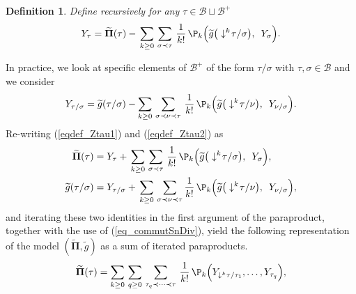 \documentclass[11pt]{preprint}
\newcommand{\mcB}{\mathcal{B}}
\newcounter{theorem}
\newtheorem{defi}[theorem]{Definition}
\def\PPi{\boldsymbol{\Pi}}
\def\eqref#1{(\ref{#1})}
\begin{document}
	\begin{defi}\label{def_Ytau}
		Define recursively for any $\tau\in \mcB \sqcup \mcB^+$ 
		\begin{equation}\label{eqdef_Ztau1}
			Y_{\tau} = \widetilde{ \PPi}(\tau) - \, \sum_{k\geq 0} \, \sum_{\sigma\prec \tau} \, \frac{1}{k!} \, \P_k\Big( \widetilde{ g}\big(\downarrow^k\hspace{-2pt} \tau/\sigma\big) , \enskip Y_\sigma  \Big).
		\end{equation}
	\end{defi}
	In practice, we look at specific elements of $\mcB^+$ of the form $ \tau / \sigma $ with $ \tau, \sigma \in \mcB $ and we consider 
	\begin{equation} \label{eqdef_Ztau2}
		Y_{\tau/\sigma} = \widetilde{ g}(\tau/\sigma) - \sum_{k\geq 0} \, \sum_{\sigma\prec \nu\prec \tau} \, \frac{1}{k!} \, \P_k\Big( \widetilde{ g}\big( \downarrow^k\hspace{-2pt}\tau/\nu\big) , \enskip Y_{\nu/\sigma}  \Big).
	\end{equation}
	Re-writing \eqref{eqdef_Ztau1} and \eqref{eqdef_Ztau2} as 
	\begin{equation}\label{eq_parac_representation}\begin{split}
			\widetilde{ \PPi}(\tau) &=Y_{\tau}  + \, \sum_{k\geq 0}\, \sum_{\sigma\prec \tau} \, \frac{1}{k!} \, \P_k\Big( \widetilde{ g}\big(\downarrow^k\hspace{-2pt} \tau/\sigma\big) , \enskip Y_\sigma  \Big),
			\\
			\widetilde{ g}(\tau/\sigma) &=Y_{\tau/\sigma}  + \,  \sum_{k\geq 0} \, \sum_{\sigma\prec \nu \prec \tau} \frac{1}{k!} \, \P_k\Big( \widetilde{ g}\big(\downarrow^k\hspace{-2pt} \tau/\nu\big) , \enskip Y_{\nu / \sigma}  \Big),
	\end{split}\end{equation}
	and iterating these two identities in the first argument of the paraproduct, together with the use of \eqref{eq_commutSnDiv}, yield the following representation of the model ${ (\widetilde{\PPi}, \widetilde{g})}$ as a sum of iterated paraproducts.
	\begin{equation}\label{eq_ParacRepIterated1}
		\widetilde{\PPi}(\tau) = \sum_{k\geq 0 } \, \sum_{q\geq 0} \, \sum_{\tau_q\prec\dots\prec\tau} \, \frac{1}{k!} \, \P_k\Big(Y_{\downarrow^k\hspace{0pt}\tau/\tau_1},\dots, Y_{\tau_q} \Big),
	\end{equation}
	
\end{document}
